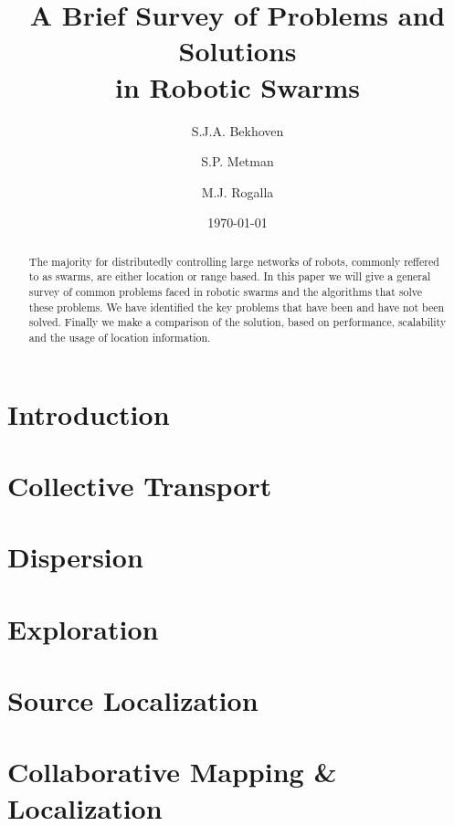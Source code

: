 \documentclass[a4paper]{article}
\title{A Brief Survey of Problems and Solutions \\ in Robotic Swarms}
\author{S.J.A. Bekhoven  \and
    S.P. Metman \and
    M.J. Rogalla}
\date{\today}
\begin{document}
\maketitle
\thispagestyle{empty}

\begin{abstract}
The majority for distributedly controlling large networks of robots, commonly reffered to as swarms, are either location or range based.
In this paper we will give a general survey of common problems faced in robotic swarms and the algorithms that solve these problems.
We have identified the key problems that have been and have not been solved. Finally we make a comparison of the solution, based on performance, scalability and the usage of location information.
\end{abstract}


\section{Introduction}
  

\section{Collective Transport}
\label{sec:CollectiveTransport}
  
  
\section{Dispersion}
  
 
 \section{Exploration}
  
 
 \section{Source Localization}
  
 
 \section{Collaborative Mapping \& Localization}
  
 
\end{document}
